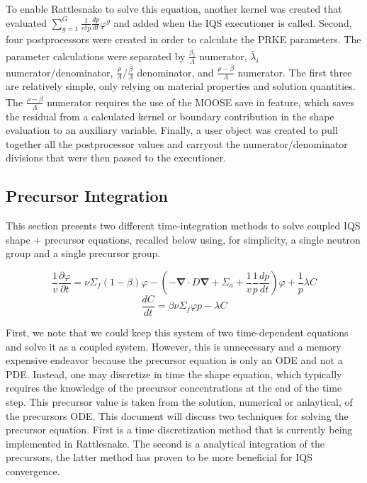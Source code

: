 \documentclass[10pt]{scrartcl}
\renewcommand{\div}{\bs{\nabla}\! \cdot \!}
\newcommand{\grad}{\bs{\nabla}}
\newcommand{\bs}[1]{\mathbf{#1}}
\newcommand{\be}{\begin{equation}}
\newcommand{\ee}{\end{equation}}
\begin{document}
To enable Rattlesnake to solve this equation, another kernel was created that evaluated $\sum_{g=1}^G\frac{1}{v^gp}\frac{dp}{dt}\varphi^g$ and added when the IQS executioner is called.  Second, four postprocessors were created in order to calculate the PRKE parameters.  The parameter calculations were separated by $\frac{\bar{\beta}_i}{\Lambda}$ numerator, $\bar{\lambda}_i$ numerator/denominator, $\frac{\rho}{\Lambda}/\frac{\bar{\beta}}{\Lambda}$ denominator, and $\frac{\rho-\bar{\beta}}{\Lambda}$ numerator.  The first three are relatively simple, only relying on material properties and solution quantities.  The $\frac{\rho-\bar{\beta}}{\Lambda}$ numerator requires the use of the MOOSE save in feature, which saves the residual from a calculated kernel or boundary contribution in the shape evaluation to an auxiliary variable.  Finally, a user object was created to pull together all the postprocessor values and carryout the numerator/denominator divisions that were then passed to the executioner.


\subsection{Precursor Integration}
This section presents two different time-integration methods to solve coupled IQS shape + precursor equations, recalled below
using, for simplicity, a single neutron group and a single precursor group.

\be
\frac{1}{v}\frac{\partial\varphi}{\partial t}=\nu\Sigma_f(1-\beta)\varphi-\left(-\div D \grad + \Sigma_a + \frac{1}{v}\frac{1}{p}\frac{dp}{dt}\right)\varphi+\frac{1}{p}\lambda C 
\ee
\be
\frac{dC}{dt} = \beta\nu \Sigma_f \varphi p - \lambda C
\ee

First, we note that we could keep this system of two time-dependent equations and solve it as a coupled system. 
However, this is unnecessary and a memory expensive endeavor because the precursor equation is only an ODE and not a PDE. 
Instead, one may discretize in time the shape equation, which typically requires the knowledge of the
precursor concentrations at the end of the time step. This precursor value is taken from the solution, numerical or anlaytical,
of the precursors ODE. This document will discuss two techniques for solving the precursor equation.  First is a time discretization method that is currently being implemented in Rattlesnake.  The second is a analytical integration of the precursors, the latter method has proven to be more beneficial for IQS convergence.
\end{document}
